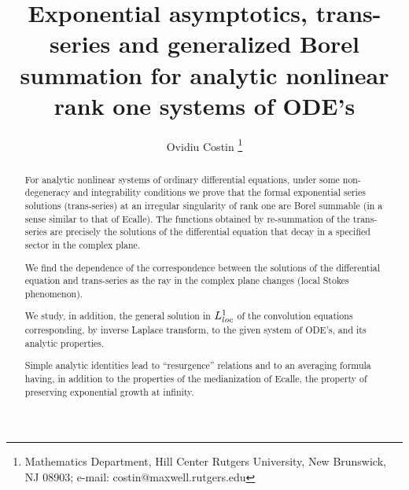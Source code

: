 \documentclass[12pt]{article}
\title { Exponential asymptotics, trans-series 
and generalized Borel summation for analytic nonlinear rank one systems
of
ODE's
}
\author{Ovidiu Costin \thanks {Mathematics Department, Hill Center
Rutgers University, New Brunswick, NJ 08903;
e-mail: costin@maxwell.rutgers.edu}}
\date{ }
\begin{document}


\maketitle
\begin{abstract}
For analytic nonlinear systems of ordinary differential equations, under
some non-degeneracy and integrability conditions we prove that 
the formal exponential series
solutions (trans-series) at an
irregular singularity  of
rank one are Borel summable (in a sense similar to that
of Ecalle).  The functions obtained by re-summation of the trans-series
are precisely the solutions of the differential equation that decay in a
specified sector in the complex plane.

We
find the dependence of the correspondence
between the solutions of the differential equation and trans-series
as the ray in the complex plane changes (local Stokes phenomenon).

We study, in addition, the general solution in ${L}^1_{loc}$ of the convolution
equations corresponding, by inverse Laplace transform,
to the given system of ODE's, and its analytic properties.

 Simple analytic identities
lead to ``resurgence'' relations and to an averaging formula
having, in addition  to the properties of the medianization
of Ecalle, the property of preserving exponential growth
at infinity.



\end{abstract}
\end{document}
